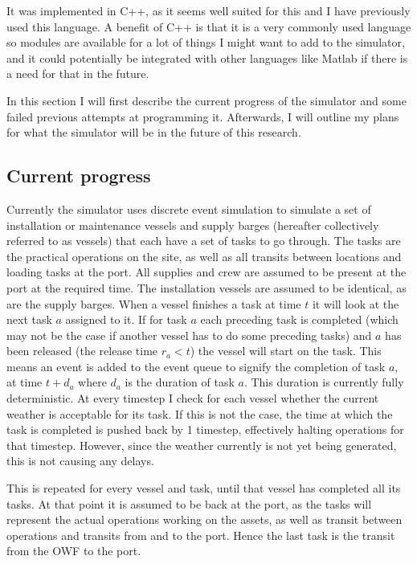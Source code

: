 \documentclass[a4paper,12pt]{article}
\begin{document}
It was implemented in C++, as it seems well suited for this and I have previously used this language. A benefit of C++ is that it is a very commonly used language so modules are available for a lot of things I might want to add to the simulator, and it could potentially be integrated with other languages like Matlab if there is a need for that in the future. 

In this section I will first describe the current progress of the simulator and some failed previous attempts at programming it. Afterwards, I will outline my plans for what the simulator will be in the future of this research.

\subsection{Current progress} \label{ss:simprog}
Currently the simulator uses discrete event simulation to simulate a set of installation or maintenance vessels and supply barges (hereafter collectively referred to as vessels) that each have a set of tasks to go through. The tasks are the practical operations on the site, as well as all transits between locations and loading tasks at the port. All supplies and crew are assumed to be present at the port at the required time. The installation vessels are assumed to be identical, as are the supply barges. When a vessel finishes a task at time $t$ it will look at the next task $a$ assigned to it. If for task $a$ each preceding task is completed (which may not be the case if another vessel has to do some preceding tasks) and $a$ has been released (the release time $r_a < t$) the vessel will start on the task. This means an event is added to the event queue to signify the completion of task $a$, at time $t + d_a$ where $d_a$ is the duration of task $a$. This duration is currently fully deterministic. At every timestep I check for each vessel whether the current weather is acceptable for its task. If this is not the case, the time at which the task is completed is pushed back by 1 timestep, effectively halting operations for that timestep. However, since the weather currently is not yet being generated, this is not causing any delays. 

This is repeated for every vessel and task, until that vessel has completed all its tasks. At that point it is assumed to be back at the port, as the tasks will represent the actual operations working on the assets, as well as transit between operations and transits from and to the port. Hence the last task is the transit from the OWF to the port. 
\end{document}

